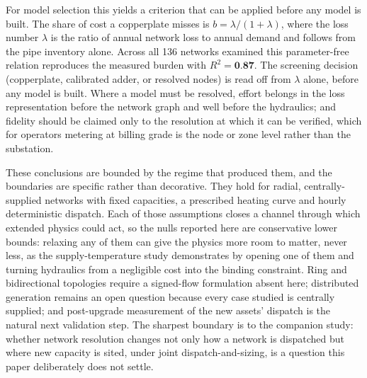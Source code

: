 For model selection this yields a criterion that can be applied before any model is built.
The share of cost a copperplate misses is $b = \lambda/(1+\lambda)$, where the loss number
$\lambda$ is the ratio of annual network loss to annual demand and follows from the pipe
inventory alone. Across all 136 networks examined this parameter-free relation reproduces
the measured burden with $R^2 = \textbf{0.87}$. The screening decision (copperplate,
calibrated adder, or resolved nodes) is read off from $\lambda$ alone, before any model is
built. Where a model must be resolved, effort belongs in the loss representation before
the network graph and well before the hydraulics; and fidelity should be claimed only to the
resolution at which it can be verified, which for operators metering at billing grade is the
node or zone level rather than the substation.

These conclusions are bounded by the regime that produced them, and the boundaries are
specific rather than decorative. They hold for radial, centrally-supplied networks with
fixed capacities, a prescribed heating curve and hourly deterministic dispatch. Each of
those assumptions closes a channel through which extended physics could act, so the nulls
reported here are conservative lower bounds: relaxing any of them can give the physics more
room to matter, never less, as the supply-temperature study demonstrates by opening one of
them and turning hydraulics from a negligible cost into the binding constraint. Ring and
bidirectional topologies require a signed-flow formulation absent here; distributed
generation remains an open question because every case studied is centrally supplied; and
post-upgrade measurement of the new assets' dispatch is the natural next validation step.
The sharpest boundary is to the companion study: whether network resolution changes not only
how a network is dispatched but where new capacity is sited, under joint
dispatch-and-sizing, is a question this paper deliberately does not settle.
